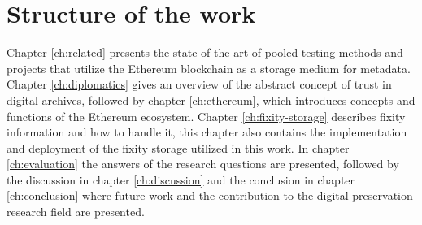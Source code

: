 \section{Structure of the work}
Chapter \ref{ch:related} presents the state of the art of pooled testing methods and projects that utilize the Ethereum blockchain as a storage medium for metadata. Chapter \ref{ch:diplomatics} gives an overview of the abstract concept of trust in digital archives, followed by chapter \ref{ch:ethereum}, which introduces concepts and functions of the Ethereum ecosystem. Chapter \ref{ch:fixity-storage} describes fixity information and how to handle it, this chapter also contains the implementation and deployment of the fixity storage utilized in this work. In chapter \ref{ch:evaluation} the answers of the research questions are presented, followed by the discussion in chapter \ref{ch:discussion} and the conclusion in chapter \ref{ch:conclusion} where future work and the contribution to the digital preservation research field are presented.